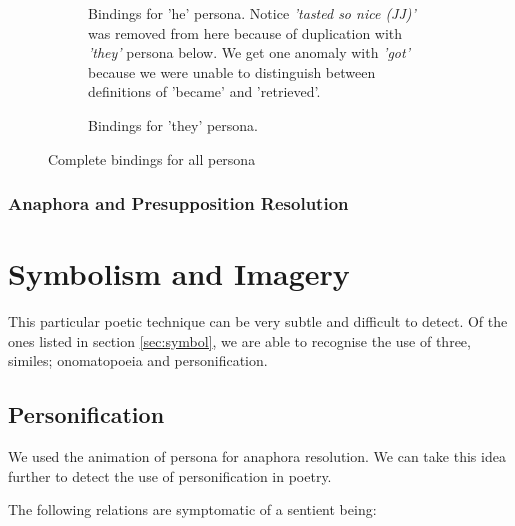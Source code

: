 \begin{figure}[h!]
\begin{subfigure}[t]{0.9\textwidth}
\begin{tikzpicture}[->, node distance=4.5cm,main node/.style={circle, draw, font=\sffamily\bfseries}]
        \end{tikzpicture}
    \caption{Bindings for 'he' persona. Notice \textit{'tasted so nice (JJ)'} was removed from here because of duplication with \textit{'they'} persona below. We get one anomaly with \textit{'got'} because we were unable to distinguish between definitions of 'became' and 'retrieved'.}
\end{subfigure}
\begin{subfigure}[t]{0.9\textwidth}
	\centering
    \caption{Bindings for 'they' persona.}
\end{subfigure}
\caption{Complete bindings for all persona}
\label{fig:all-binded}
\end{figure}

\subsubsection{Anaphora and Presupposition Resolution}


\section{Symbolism and Imagery}

This particular poetic technique can be very subtle and difficult to detect. Of the ones listed in section \ref{sec:symbol}, we are able to recognise the use of three, similes; onomatopoeia and personification.

\subsection{Personification}

We used the animation of persona for anaphora resolution. We can take this idea further to detect the use of personification in poetry.

The following relations are symptomatic of a sentient being:

